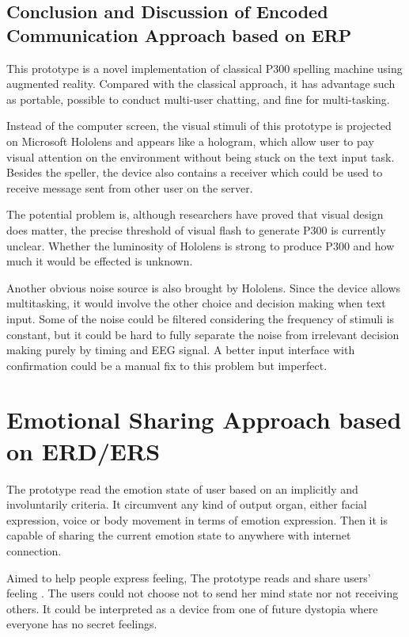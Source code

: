 \documentclass[a4paper]{article}
\begin{document}
\subsection{Conclusion and Discussion of Encoded Communication Approach based on ERP}

This prototype is a novel implementation of classical P300 spelling machine using augmented reality. Compared with the classical approach, it has advantage such as portable, possible to conduct multi-user chatting, and fine for multi-tasking. 

Instead of the computer screen, the visual stimuli of this prototype is projected on Microsoft Hololens and appears like a hologram, which allow user to pay visual attention on the environment without being stuck on the text input task. Besides the speller, the device also contains a receiver which could be used to receive message sent from other user on the server.

The potential problem is, although researchers have proved that visual design does matter\autocite{sakai2012alphabet}, the precise threshold of visual flash to generate P300 is currently unclear. Whether the luminosity of Hololens is strong to produce P300 and how much it would be effected is unknown.

Another obvious noise source is also brought by Hololens. Since the device allows multitasking, it would involve the other choice and decision making when text input. Some of the noise could be filtered considering the frequency of stimuli is constant, but it could be hard to fully separate the noise from irrelevant decision making purely by timing and EEG signal. A better input interface with confirmation could be a manual fix to this problem but imperfect.  

\section{Emotional Sharing Approach based on ERD/ERS}

The prototype read the emotion state of user based on an implicitly and involuntarily criteria. It circumvent any kind of output organ, either facial expression, voice or body movement in terms of emotion expression. Then it is capable of sharing the current emotion state to anywhere with internet connection.

Aimed to help people express feeling, The prototype reads and share users' feeling . The users could not choose not to send her mind state nor not receiving others. It could be interpreted as a device from one of future dystopia where everyone has no secret feelings.
\end{document}
